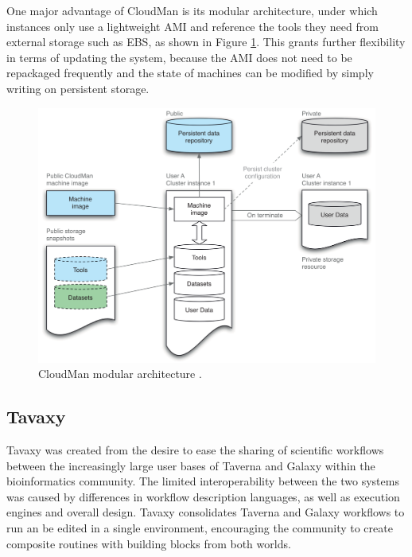 \documentclass[11pt,a4paper]{report}
\begin{document}


One major advantage of CloudMan is its modular architecture, under which instances only use a lightweight AMI and reference the tools they need from external storage such as EBS, as shown in Figure \ref{CloudManArch}. This grants further flexibility in terms of updating the system, because the AMI does not need to be repackaged frequently and the state of machines can be modified by simply writing on persistent storage.

\vspace{5mm}
\begin{figure}[h]
	\centering
		\includegraphics[scale=0.35]{figures/CloudManArch.png}
	\caption{CloudMan modular architecture \cite{Afgan2010}.}
	\label{CloudManArch}
\end{figure}

\subsection{Tavaxy}

Tavaxy \cite{Abouelhoda2012} was created from the desire to ease the sharing of scientific workflows between the increasingly large user bases of Taverna and Galaxy within the bioinformatics community. The limited interoperability between the two systems was caused by differences in workflow description languages, as well as execution engines and overall design. Tavaxy consolidates Taverna and Galaxy workflows to run an be edited in a single environment, encouraging the community to create composite routines with building blocks from both worlds.
\end{document}

